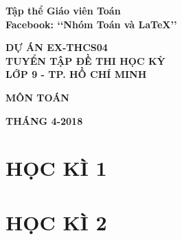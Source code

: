 \documentclass[12pt,a4paper,oneside]{book}
\renewcommand{\baselinestretch}{1.4}
\begin{document}
\providecommand*{\dx}{\ensuremath{\mathrm{\,d}}x}
\providecommand*{\unit}[1]{\ensuremath{\mathrm{\,#1}}}

\begin{titlepage}
\begin{center}
\fontsize{17}{0}\selectfont
\textbf{Tập thể Giáo viên Toán}\\
\textbf{Facebook: \lq\lq Nhóm Toán và \LaTeX \rq\rq}\\
\end{center}

\vspace{4cm}

\begin{center}

\vspace{1cm}
 \textbf{\fontsize{20}{0}\selectfont DỰ ÁN EX-THCS04}\\
 \vspace{0.5cm}
 \textbf{\fontsize{35}{0}\selectfont T\fontsize{30}{0}\selectfont UYỂN TẬP ĐỀ THI HỌC KỲ \\ LỚP 9 - TP. HỒ CHÍ MINH}
 
 \vspace{1cm}
 
 \textbf{\fontsize{40}{0}\selectfont MÔN TOÁN}\\
  \vspace{2cm}
 
\end{center}


\vfill{
\begin{center}
\fontsize{17}{0}\textbf{THÁNG 4-2018}
\end{center}
}
\end{titlepage}
\renewcommand{\headrulewidth}{0.4pt}

{\renewcommand{\baselinestretch}{1.3}

	\newpage
\tableofcontents
}
	\newpage
	\chapter{HỌC KÌ 1}
	
	
	
	\chapter{HỌC KÌ 2}
	
	
	
	
	
		
	
	
	
	
	
	
	
	

	
	
\end{document}
